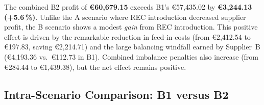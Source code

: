 The combined B2 profit of \textbf{€60{,}679.15} exceeds B1's €57{,}435.02 by
\textbf{€3{,}244.13 (+5.6\,\%)}.  Unlike the A scenario where REC introduction
decreased supplier profit, the B scenario shows a modest \emph{gain} from
REC introduction.  This positive effect is driven by the remarkable reduction
in feed-in costs (from €2,412.54 to €197.83, saving €2,214.71) and the
large balancing windfall earned by Supplier~B (€4,193.36 vs.\ €112.73 in B1).
Combined imbalance penalties also increase (from €284.44 to €1,439.38), but
the net effect remains positive.

\subsection{Intra-Scenario Comparison: B1 versus B2}
\label{sec:results_B_comparison}

